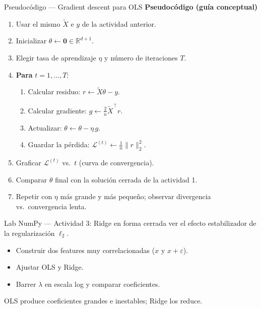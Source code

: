 \begin{frame}{Pseudocódigo — Gradient descent para OLS}
\footnotesize
\textbf{Pseudocódigo (guía conceptual)}
\begin{enumerate}\footnotesize
  \item Usar el mismo $\tilde X$ e $y$ de la actividad anterior.
  \item Inicializar $\theta\leftarrow \mathbf{0}\in\mathbb{R}^{d+1}$.
  \item Elegir tasa de aprendizaje $\eta$ y número de iteraciones $T$.
  \item \textbf{Para} $t = 1,\dots,T$:
  \begin{enumerate}\scriptsize
    \item Calcular residuo: $r \leftarrow \tilde X\theta - y$.
    \item Calcular gradiente: $g \leftarrow \frac{2}{n}\tilde X^\top r$.
    \item Actualizar: $\theta \leftarrow \theta - \eta\, g$.
    \item Guardar la pérdida: $\mathcal{L}^{(t)} \leftarrow \frac{1}{n}\|r\|_2^2$.
  \end{enumerate}
  \item Graficar $\mathcal{L}^{(t)}$ vs.\ $t$ (curva de convergencia).
  \item Comparar $\theta$ final con la solución cerrada de la actividad 1.
  \item Repetir con $\eta$ más grande y más pequeño; observar divergencia vs.\ convergencia lenta.
\end{enumerate}
\end{frame}

\begin{frame}{Lab NumPy — Actividad 3: Ridge en forma cerrada}
 ver el efecto estabilizador de la regularización $\ell_2$.
\begin{itemize}\small
  \item Construir dos features muy correlacionadas ($x$ y $x+\varepsilon$).
  \item Ajustar OLS y Ridge.
  \item Barrer $\lambda$ en escala log y comparar coeficientes.
\end{itemize}

\vspace{0.2em}
OLS produce coeficientes grandes e inestables; Ridge los reduce.
\end{frame}

